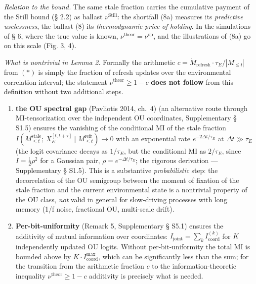 \documentclass[pdflatex,sn-mathphys-ay]{sn-jnl}
\begin{document}
\emph{Relation to the bound.} The same stale fraction carries the cumulative payment of the Still bound (§ 2.2) as ballast \(\nu^{\text{Still}}\): the shortfall (8a) measures its \emph{predictive uselessness}, the ballast (8) its \emph{thermodynamic price of holding}. In the simulations of § 6, where the true value is known, \(\nu^{\text{theor}} = \nu^{\text{op}}\), and the illustrations of (8a) go on this scale (Fig. 3, 4).



\emph{What is nontrivial in Lemma 2.} Formally the arithmetic \(c = \dot{M}_{\text{refresh}} \cdot \tau_E / |M_{\le t}|\) from \((*)\) is simply the fraction of refresh updates over the environmental correlation interval; the statement \(\nu^{\text{theor}} \ge 1 - c\) \textbf{does not follow} from this definition without two additional steps.



\begin{enumerate}

\def\labelenumi{(\roman{enumi})}

\item

  \textbf{the OU spectral gap} (Pavliotis 2014, ch.~4) (an alternative route through MI-tensorization over the independent OU coordinates, Supplementary § S1.5) ensures the vanishing of the conditional MI of the stale fraction \(I(M_{\le t}^{\text{stale}};\, X_E^{[t,t+\tau]} \mid M_{\le t}^{\text{refr}}) \to 0\) with an exponential rate \(e^{-2\Delta t/\tau_E}\) at \(\Delta t \gg \tau_E\) (the logit covariance decays as \(1/\tau_E\), but the conditional MI as \(2/\tau_E\), since \(I = \tfrac12\rho^2\) for a Gaussian pair, \(\rho = e^{-\Delta t/\tau_E}\); the rigorous derivation --- Supplementary § S1.5). This is a substantive \emph{probabilistic} step: the decorrelation of the OU semigroup between the moment of fixation of the stale fraction and the current environmental state is a nontrivial property of the OU class, \emph{not} valid in general for slow-driving processes with long memory (1/f noise, fractional OU, multi-scale drift).

\item

  \textbf{Per-bit-uniformity} (Remark 5, Supplementary § S5.1) ensures the additivity of mutual information over coordinates: \(I_{\text{joint}} = \sum_k I_{\text{coord}}^{(k)}\) for \(K\) independently updated OU logits. Without per-bit-uniformity the total MI is bounded above by \(K \cdot I_{\text{coord}}^{\max}\), which can be significantly less than the sum; for the transition from the arithmetic fraction \(c\) to the information-theoretic inequality \(\nu^{\text{theor}} \ge 1-c\) additivity is precisely what is needed.

\end{enumerate}
\end{document}
